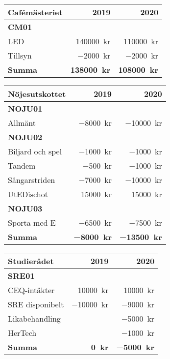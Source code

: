 \documentclass[10pt]{article}
\begin{document}
    \begin{tabularx}{10cm}{X r r}
        \textbf{\large Cafémästeriet} & \textbf{2019} & \textbf{2020} \\
        \hline
        \textbf{CM01} \\
        LED & \SI{140000}{kr} & \SI{110000}{kr} \\
        Tillsyn & \SI{-2000}{kr} & \SI{-2000}{kr} \\
        \hline
        \textbf{Summa} & \textbf{\SI{138000}{kr}} & \textbf{\SI{108000}{kr}} \\
    \end{tabularx}
    
    \begin{tabularx}{10cm}{X r r}
        \textbf{\large Nöjesutskottet} & \textbf{2019} & \textbf{2020} \\
        \hline
        \textbf{NOJU01} \\
        Allmänt & \SI{-8000}{kr} & \SI{-10000}{kr} \\
        \textbf{NOJU02} \\
        Biljard och spel & \SI{-1000}{kr} & \SI{-1000}{kr} \\
        Tandem & \SI{-500}{kr} & \SI{-1000}{kr} \\
        Sångarstriden & \SI{-7000}{kr} & \SI{-10000}{kr} \\
        UtEDischot & \SI{15000}{kr} & \SI{15000}{kr} \\
        \textbf{NOJU03} \\
        Sporta med E & \SI{-6500}{kr} & \SI{-7500}{kr} \\
        \hline
        \textbf{Summa} & \textbf{\SI{-8000}{kr}} & \textbf{\SI{-13500}{kr}} \\
    \end{tabularx}
    
    \begin{tabularx}{10cm}{X r r}
        \textbf{\large Studierådet} & \textbf{2019} & \textbf{2020} \\
        \hline
        \textbf{SRE01} \\
        CEQ-intäkter & \SI{10000}{kr} & \SI{10000}{kr} \\
        SRE disponibelt & \SI{-10000}{kr} & \SI{-9000}{kr} \\
        Likabehandling & & \SI{-5000}{kr} \\
        HerTech & & \SI{-1000}{kr} \\
        \hline
        \textbf{Summa} & \textbf{\SI{0}{kr}} & \textbf{\SI{-5000}{kr}} \\
    \end{tabularx}
    
\end{document}
